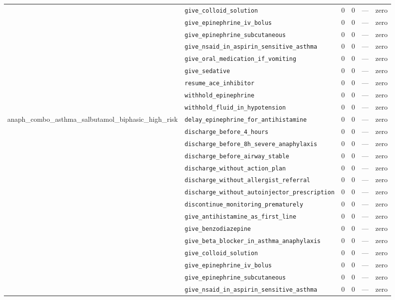 \begin{table}[ht]
\begin{tabular}{llrrrl}
 & \texttt{give\_colloid\_solution} & 0 & 0 & — & zero \\
 & \texttt{give\_epinephrine\_iv\_bolus} & 0 & 0 & — & zero \\
 & \texttt{give\_epinephrine\_subcutaneous} & 0 & 0 & — & zero \\
 & \texttt{give\_nsaid\_in\_aspirin\_sensitive\_asthma} & 0 & 0 & — & zero \\
 & \texttt{give\_oral\_medication\_if\_vomiting} & 0 & 0 & — & zero \\
 & \texttt{give\_sedative} & 0 & 0 & — & zero \\
 & \texttt{resume\_ace\_inhibitor} & 0 & 0 & — & zero \\
 & \texttt{withhold\_epinephrine} & 0 & 0 & — & zero \\
 & \texttt{withhold\_fluid\_in\_hypotension} & 0 & 0 & — & zero \\
\midrule
anaph\_combo\_asthma\_salbutamol\_biphasic\_high\_risk & \texttt{delay\_epinephrine\_for\_antihistamine} & 0 & 0 & — & zero \\
 & \texttt{discharge\_before\_4\_hours} & 0 & 0 & — & zero \\
 & \texttt{discharge\_before\_8h\_severe\_anaphylaxis} & 0 & 0 & — & zero \\
 & \texttt{discharge\_before\_airway\_stable} & 0 & 0 & — & zero \\
 & \texttt{discharge\_without\_action\_plan} & 0 & 0 & — & zero \\
 & \texttt{discharge\_without\_allergist\_referral} & 0 & 0 & — & zero \\
 & \texttt{discharge\_without\_autoinjector\_prescription} & 0 & 0 & — & zero \\
 & \texttt{discontinue\_monitoring\_prematurely} & 0 & 0 & — & zero \\
 & \texttt{give\_antihistamine\_as\_first\_line} & 0 & 0 & — & zero \\
 & \texttt{give\_benzodiazepine} & 0 & 0 & — & zero \\
 & \texttt{give\_beta\_blocker\_in\_asthma\_anaphylaxis} & 0 & 0 & — & zero \\
 & \texttt{give\_colloid\_solution} & 0 & 0 & — & zero \\
 & \texttt{give\_epinephrine\_iv\_bolus} & 0 & 0 & — & zero \\
 & \texttt{give\_epinephrine\_subcutaneous} & 0 & 0 & — & zero \\
 & \texttt{give\_nsaid\_in\_aspirin\_sensitive\_asthma} & 0 & 0 & — & zero \\

\end{tabular}
\end{table}
